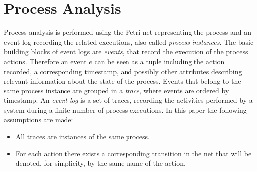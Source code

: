 \documentclass{llncs}
\begin{document}
\section{Process Analysis}\label{Background}
Process analysis is performed using the Petri net representing the process and an event log recording the related executions, also called \emph{process instances}. The basic building blocks of event logs are \emph{events}, that record the execution of the process actions. Therefore an event $e$ can be seen as a tuple including the action recorded, a corresponding timestamp, and possibly other attributes describing relevant information about the state of the process.  
Events that belong to the same process instance are grouped in a {\itshape trace}, where events are ordered 
by timestamp. An \emph{event log} is a set of traces, recording the activities performed by a system during a finite number of process executions.  In this paper the following assumptions are made:
\begin{itemize}
\item All traces are instances of the same process.
\item For each action there exists a corresponding transition in the net that will be denoted, for simplicity, by the same name of the action.
\end{itemize}
\end{document}
